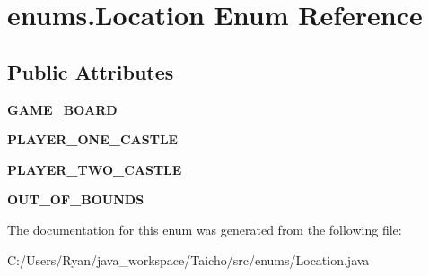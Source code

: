 \hypertarget{enumenums_1_1_location}{\section{enums.\-Location Enum Reference}
\label{enumenums_1_1_location}
}
\subsection*{Public Attributes}
\begin{DoxyCompactItemize}
\item 
\hypertarget{enumenums_1_1_location_a1524c8615f4748a7cb81ae56dd6c5909}{{\bfseries G\-A\-M\-E\-\_\-\-B\-O\-A\-R\-D}}\label{enumenums_1_1_location_a1524c8615f4748a7cb81ae56dd6c5909}

\item 
\hypertarget{enumenums_1_1_location_a9c724028131ac7e84358faa1e3d7ebbd}{{\bfseries P\-L\-A\-Y\-E\-R\-\_\-\-O\-N\-E\-\_\-\-C\-A\-S\-T\-L\-E}}\label{enumenums_1_1_location_a9c724028131ac7e84358faa1e3d7ebbd}

\item 
\hypertarget{enumenums_1_1_location_aeb9b458686ad9624de583d5fa5af8484}{{\bfseries P\-L\-A\-Y\-E\-R\-\_\-\-T\-W\-O\-\_\-\-C\-A\-S\-T\-L\-E}}\label{enumenums_1_1_location_aeb9b458686ad9624de583d5fa5af8484}

\item 
\hypertarget{enumenums_1_1_location_af58fc87846f41ca725f305ec0a8c275b}{{\bfseries O\-U\-T\-\_\-\-O\-F\-\_\-\-B\-O\-U\-N\-D\-S}}\label{enumenums_1_1_location_af58fc87846f41ca725f305ec0a8c275b}

\end{DoxyCompactItemize}


The documentation for this enum was generated from the following file\-:\begin{DoxyCompactItemize}
\item 
C\-:/\-Users/\-Ryan/java\-\_\-workspace/\-Taicho/src/enums/Location.\-java\end{DoxyCompactItemize}
